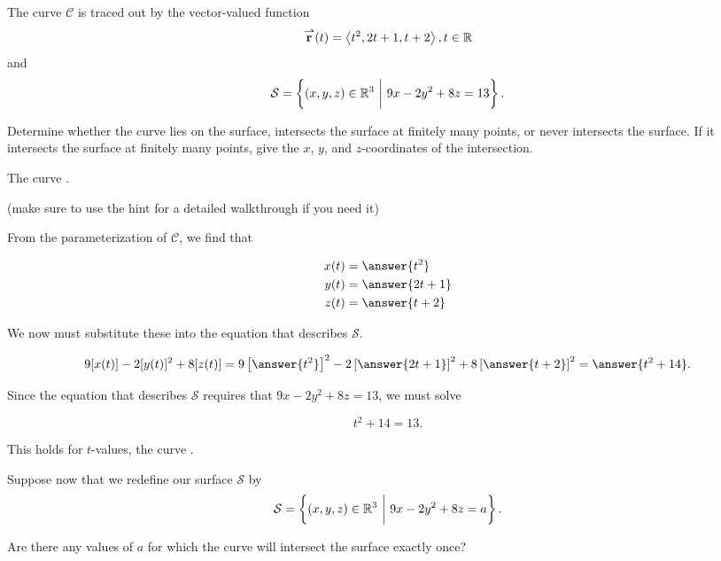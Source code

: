 \documentclass{ximera}
\author{Jim Talamo}
\begin{document}
\begin{exercise}
The curve $\mathcal{C}$ is traced out by the vector-valued function \[{\overset{\boldsymbol{\rightharpoonup}}{\mathbf{r}}}(t) = \left\langle t^2,2t+1,t+2\right\rangle, t \in \mathbb R \] and \[\mathcal{S} = \left\{(x,y,z)\in \mathbb R^3 ~ \bigg| ~ 9x-2y^2+8z = 13 \right\}.\]

Determine whether the curve lies on the surface, intersects the surface at finitely many points, or never intersects the surface.  If it intersects the surface at finitely many points, give the $x$, $y$, and $z$-coordinates of the intersection.

The curve .

(make sure to use the hint for a detailed walkthrough if you need it)
\begin{hint}
From the parameterization of $\mathcal{C}$, we find that 

\begin{align*}
x(t)&= \answer{t^2} \\
y(t)&= \answer{2t+1} \\
z(t)&= \answer{t+2} \\
\end{align*}

We now must substitute these into the equation that describes $\mathcal{S}$.

\[
9[x(t)]-2[y(t)]^2+8[z(t)] = 9 \left[ \answer{t^2} \right]^2 -2 \left[ \answer{2t+1} \right]^2 + 8 \left[ \answer{t+2} \right]^2 = \answer{t^2+14}.
\]

Since the equation that describes $\mathcal{S}$ requires that $9x-2y^2+8z = 13$, we must solve

\[
t^2+14 = 13.
\]

This holds for  $t$-values, the curve .
\end{hint}

\begin{exercise}
Suppose now that we redefine our surface $\mathcal{S}$ by  \[\mathcal{S} = \left\{(x,y,z)\in \mathbb R^3 ~ \bigg| ~ 9x-2y^2+8z = a \right\}.\]

Are there any values of $a$ for which the curve will intersect the surface exactly once?

\begin{multipleChoice}
\end{multipleChoice}


\end{exercise}
\end{exercise}
\end{document}
